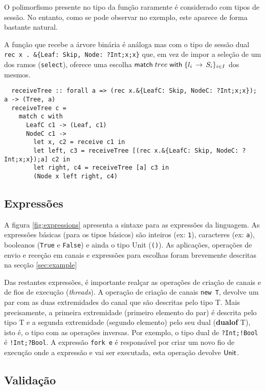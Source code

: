 O polimorfismo presente no tipo da função raramente é considerado com tipos de sessão. No entanto, como se pode observar no exemplo, este aparece de forma bastante natural.%

A função que recebe a árvore binária é análoga mas com o tipo de sessão dual \lstinline"rec x . &{Leaf: Skip, Node: ?Int;x;x}" que, em vez de impor a seleção de um dos ramos (\lstinline"select"), oferece uma escolha $\mathsf{match}\;tree\;\mathsf{with}\;\{l_i\,\to\,S_i\}_{i\in I}$ dos mesmos.
\begin{lstlisting}
  receiveTree :: forall a => (rec x.&{LeafC: Skip, NodeC: ?Int;x;x}); a -> (Tree, a)
  receiveTree c =
    match c with
      LeafC c1 -> (Leaf, c1)
      NodeC c1 ->
        let x, c2 = receive c1 in
        let left, c3 = receiveTree [(rec x.&{LeafC: Skip, NodeC: ?Int;x;x});a] c2 in
        let right, c4 = receiveTree [a] c3 in
        (Node x left right, c4)
\end{lstlisting}


\subsection{Expressões}
A figura \ref{fig:expressions} apresenta a sintaxe para as expressões da linguagem. As expressões básicas (para os tipos básicos) são inteiros (ex: \lstinline"1"), caracteres (ex: \lstinline"a"), booleanos (\lstinline"True" e \lstinline"False") e ainda o tipo Unit (\lstinline|()|).
As aplicações, operações de envio e receção em canais e expressões para escolhas foram brevemente descritas na secção \ref{sec:example}

Das restantes expressões, é importante realçar as operações de criação de canais e de fios de execução (\textit{threads}).
A operação de criação de canais \lstinline"new T", devolve um par com as duas extremidades do canal que são descritas pelo tipo T. Mais precisamente, a primeira extremidade (primeiro elemento do par) é descrita pelo tipo T e a segunda extremidade (segundo elemento) pelo seu dual (\textbf{dualof} T), isto é, o tipo com as operações inversas. Por exemplo, o tipo dual de \lstinline|?Int;!Bool| é \lstinline|!Int;?Bool|.
A expressão \lstinline"fork e" é responsável por criar um novo fio de execução onde a expressão e vai ser executada, esta operação devolve $\mathsf{Unit}$.


\subsection{Validação}

